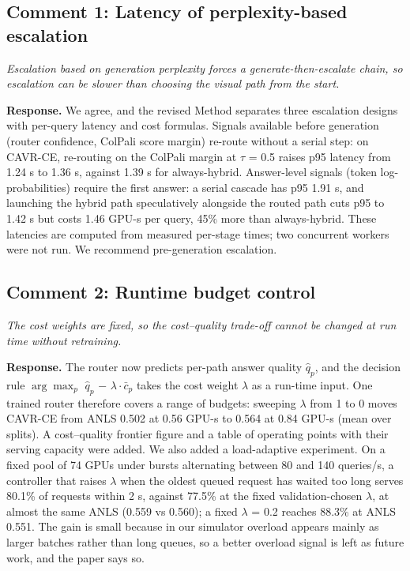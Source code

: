 \documentclass[11pt]{article}
\newcommand{\reviewer}[1]{{\color{blue!55!black}\itshape #1\par}}
\begin{document}
\subsection*{Comment 1: Latency of perplexity-based escalation}
\reviewer{Escalation based on generation perplexity forces a generate-then-escalate chain, so escalation can be slower than choosing the visual path from the start.}
\textbf{Response.} We agree, and the revised Method separates three escalation designs with per-query latency and cost formulas. Signals available before generation (router confidence, ColPali score margin) re-route without a serial step: on CAVR-CE, re-routing on the ColPali margin at $\tau$ = 0.5 raises p95 latency from 1.24 s to 1.36 s, against 1.39 s for always-hybrid. Answer-level signals (token log-probabilities) require the first answer: a serial cascade has p95 1.91 s, and launching the hybrid path speculatively alongside the routed path cuts p95 to 1.42 s but costs 1.46 GPU-s per query, 45\% more than always-hybrid. These latencies are computed from measured per-stage times; two concurrent workers were not run. We recommend pre-generation escalation.

\subsection*{Comment 2: Runtime budget control}
\reviewer{The cost weights are fixed, so the cost--quality trade-off cannot be changed at run time without retraining.}
\textbf{Response.} The router now predicts per-path answer quality $\hat{q}_p$, and the decision rule $\arg\max_p$ $\hat{q}_p$ $-$ $\lambda\cdot\bar{c}_p$ takes the cost weight $\lambda$ as a run-time input. One trained router therefore covers a range of budgets: sweeping $\lambda$ from 1 to 0 moves CAVR-CE from ANLS 0.502 at 0.56 GPU-s to 0.564 at 0.84 GPU-s (mean over splits). A cost--quality frontier figure and a table of operating points with their serving capacity were added. We also added a load-adaptive experiment. On a fixed pool of 74 GPUs under bursts alternating between 80 and 140 queries/s, a controller that raises $\lambda$ when the oldest queued request has waited too long serves 80.1\% of requests within 2 s, against 77.5\% at the fixed validation-chosen $\lambda$, at almost the same ANLS (0.559 vs 0.560); a fixed $\lambda$ = 0.2 reaches 88.3\% at ANLS 0.551. The gain is small because in our simulator overload appears mainly as larger batches rather than long queues, so a better overload signal is left as future work, and the paper says so.
\end{document}
